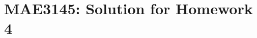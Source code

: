 \documentclass[10pt]{article}
\date{}
\newcommand{\parenth}[1]{\ensuremath{\left( #1 \right)}}
\theoremstyle{plain}\theorembodyfont{\normalfont}
\newtheorem{prob}{Problem}[section]
\newenvironment{subprob}%
{\renewcommand{\theenumi}{\alph{enumi}}\renewcommand{\labelenumi}{(\theenumi)}\begin{enumerate}}%
{\end{enumerate}}%
\begin{document}
\pagestyle{empty}
\section*{MAE3145: Solution for Homework 4}


%
%
%
%
%
%
%
%
\end{document}
